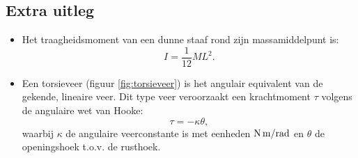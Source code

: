 \documentclass[a4paper,11pt]{article}
\begin{document}
\subsection*{Extra uitleg}
\begin{itemize}
    \item Het traagheidsmoment van een dunne staaf rond zijn massamiddelpunt is:
\begin{equation}
    I=\frac{1}{12}ML^2.
\end{equation}
    \item  Een torsieveer (figuur \ref{fig:torsieveer}) is het angulair equivalent van de gekende, lineaire veer. Dit type veer veroorzaakt een krachtmoment $\tau$ volgens de angulaire wet van Hooke:
    \begin{equation}
       \tau = -\kappa \theta,
    \end{equation}
    waarbij $\kappa$ de angulaire veerconstante is met eenheden ${\rm N\, m/rad }$ en $\theta$ de openingshoek t.o.v. de rusthoek.
    \end{itemize}
\end{document}
